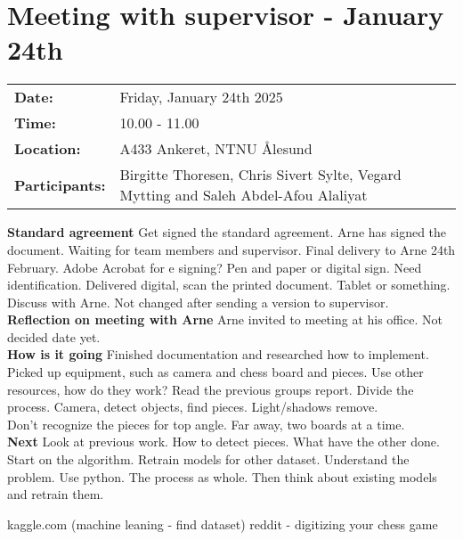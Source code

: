 \section{Meeting with supervisor - January 24th}
\begin{tabular}{ll}
    \textbf{Date:} & Friday, January 24th 2025 \\
    \textbf{Time:} & 10.00 - 11.00\\
    \textbf{Location:} & A433 Ankeret, NTNU Ålesund \\
    \textbf{Participants:} & Birgitte Thoresen, Chris Sivert Sylte, Vegard Mytting and Saleh Abdel-Afou Alaliyat\\
\end{tabular}

\vspace{0.5cm}

\textbf{Standard agreement}
Get signed the standard agreement. Arne has signed the document. Waiting for team members and supervisor. Final delivery to Arne 24th February. Adobe Acrobat for e signing? Pen and paper or digital sign. Need identification. Delivered digital, scan the printed document. Tablet or something. Discuss with Arne. Not changed after sending a version to supervisor. \\

\textbf{Reflection on meeting with Arne}
Arne invited to meeting at his office. Not decided date yet. \\

\textbf{How is it going}
Finished documentation and researched how to implement. Picked up equipment, such as camera and chess board and pieces. Use other resources, how do they work? Read the previous groups report. Divide the process. Camera, detect objects, find pieces. Light/shadows remove. \\

Don't recognize the pieces for top angle. Far away, two boards at a time. \\

\textbf{Next} 
Look at previous work. How to detect pieces. What have the other done. Start on the algorithm. Retrain models for other dataset. Understand the problem. Use python. The process as whole. Then think about existing models and retrain them. 

kaggle.com (machine leaning - find dataset)
reddit - digitizing your chess game